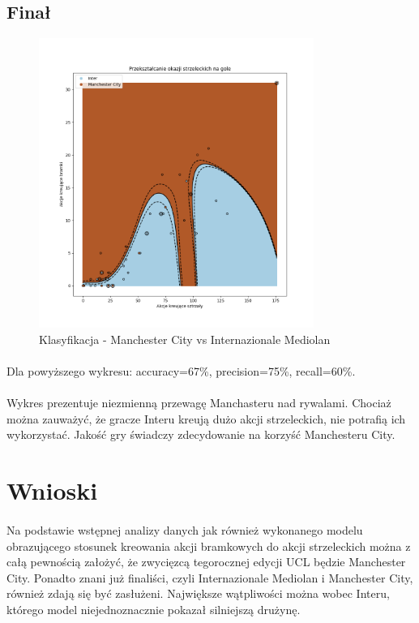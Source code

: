 \documentclass[12pt, letterpaper]{article}
\begin{document}
\subsection{Finał}
\begin{figure}[ht]
    \centering
    \includegraphics[width=0.8\textwidth]{images/06707506ManInter.png}
    \caption{Klasyfikacja - Manchester City vs Internazionale Mediolan}
    \label{fig:enter-label}
\end{figure}
\paragraph{} Dla powyższego wykresu: accuracy=67\%, precision=75\%, recall=60\%.
\paragraph{} Wykres prezentuje niezmienną przewagę Manchasteru nad rywalami. Chociaż można zauważyć, że gracze Interu kreują dużo akcji strzeleckich, nie potrafią ich wykorzystać. Jakość gry świadczy zdecydowanie na korzyść Manchesteru City.
\section{Wnioski}
\paragraph{} Na podstawie wstępnej analizy danych jak również wykonanego modelu obrazującego stosunek kreowania akcji bramkowych do akcji strzeleckich można z całą pewnością założyć, że zwycięzcą tegorocznej edycji UCL będzie Manchester City. Ponadto znani już finaliści, czyli Internazionale Mediolan i Manchester City, również zdają się być zasłużeni. Największe wątpliwości można wobec Interu, którego model niejednoznacznie pokazał silniejszą drużynę.
\end{document}
